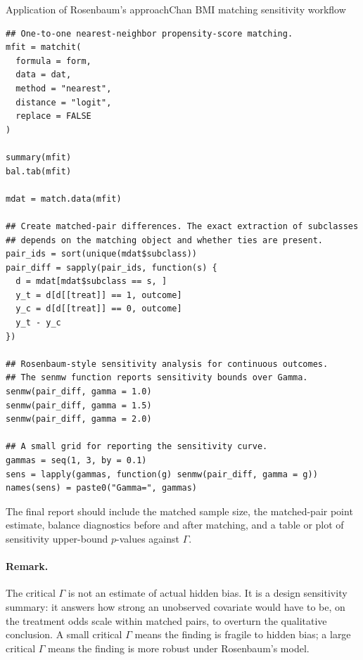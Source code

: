 \begin{exercisesolution}{Application of Rosenbaum's approach}{Chan BMI matching sensitivity workflow}
\begin{lstlisting}
## One-to-one nearest-neighbor propensity-score matching.
mfit = matchit(
  formula = form,
  data = dat,
  method = "nearest",
  distance = "logit",
  replace = FALSE
)

summary(mfit)
bal.tab(mfit)

mdat = match.data(mfit)

## Create matched-pair differences. The exact extraction of subclasses
## depends on the matching object and whether ties are present.
pair_ids = sort(unique(mdat$subclass))
pair_diff = sapply(pair_ids, function(s) {
  d = mdat[mdat$subclass == s, ]
  y_t = d[d[[treat]] == 1, outcome]
  y_c = d[d[[treat]] == 0, outcome]
  y_t - y_c
})

## Rosenbaum-style sensitivity analysis for continuous outcomes.
## The senmw function reports sensitivity bounds over Gamma.
senmw(pair_diff, gamma = 1.0)
senmw(pair_diff, gamma = 1.5)
senmw(pair_diff, gamma = 2.0)

## A small grid for reporting the sensitivity curve.
gammas = seq(1, 3, by = 0.1)
sens = lapply(gammas, function(g) senmw(pair_diff, gamma = g))
names(sens) = paste0("Gamma=", gammas)
\end{lstlisting}

The final report should include the matched sample size, the matched-pair point estimate, balance diagnostics before and after matching, and a table or plot of sensitivity upper-bound $p$-values against $\Gamma$.

\paragraph{Remark.}
The critical $\Gamma$ is not an estimate of actual hidden bias. It is a design sensitivity summary: it answers how strong an unobserved covariate would have to be, on the treatment odds scale within matched pairs, to overturn the qualitative conclusion. A small critical $\Gamma$ means the finding is fragile to hidden bias; a large critical $\Gamma$ means the finding is more robust under Rosenbaum's model.
\end{exercisesolution}
